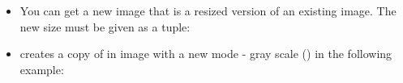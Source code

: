 \documentclass[letterpaper,10pt,english]{sphinxmanual}
\begin{document}
\begin{itemize}
\item {} 
You can get a new image that is a resized version of an existing
image. The new size must be given as a tuple:

%
\begin{sphinxVerbatim}[commandchars=\\\{\}]
  
\end{sphinxVerbatim}

\item {} 
 creates a copy of in image with a new mode -
gray scale () in the following example:

%
\begin{sphinxVerbatim}[commandchars=\\\{\}]
  
\end{sphinxVerbatim}

\end{itemize}
\end{document}
